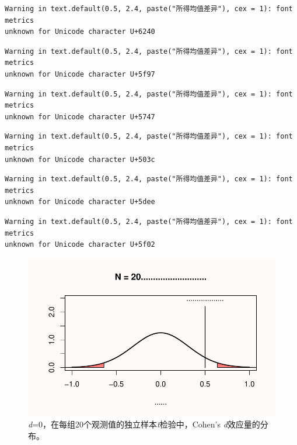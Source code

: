 \documentclass[
  letterpaper,
  DIV=11,
  numbers=noendperiod]{scrreprt}
\begin{document}
\begin{verbatim}
Warning in text.default(0.5, 2.4, paste("所得均值差异"), cex = 1): font metrics
unknown for Unicode character U+6240
\end{verbatim}

\begin{verbatim}
Warning in text.default(0.5, 2.4, paste("所得均值差异"), cex = 1): font metrics
unknown for Unicode character U+5f97
\end{verbatim}

\begin{verbatim}
Warning in text.default(0.5, 2.4, paste("所得均值差异"), cex = 1): font metrics
unknown for Unicode character U+5747
\end{verbatim}

\begin{verbatim}
Warning in text.default(0.5, 2.4, paste("所得均值差异"), cex = 1): font metrics
unknown for Unicode character U+503c
\end{verbatim}

\begin{verbatim}
Warning in text.default(0.5, 2.4, paste("所得均值差异"), cex = 1): font metrics
unknown for Unicode character U+5dee
\end{verbatim}

\begin{verbatim}
Warning in text.default(0.5, 2.4, paste("所得均值差异"), cex = 1): font metrics
unknown for Unicode character U+5f02
\end{verbatim}

\begin{figure}

{\centering \includegraphics[width=1\textwidth,height=\textheight]{01-pvalue_files/figure-pdf/fig-fig138-1.pdf}

}

\caption{\label{fig-fig138}\emph{d}=0，在每组20个观测值的独立样本\emph{t}检验中，Cohen's
\emph{d}效应量的分布。}

\end{figure}
\end{document}
